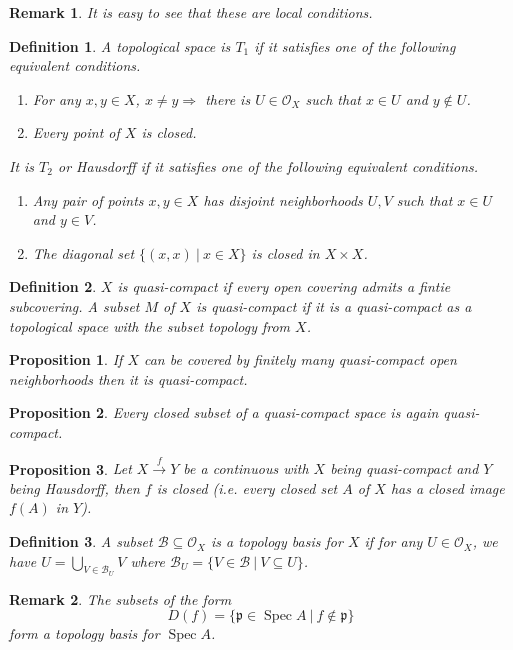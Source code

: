 \documentclass[8pt]{article}
\numberwithin{equation}{section}
\newtheorem{proposition}{Proposition}[subsection]
\newtheorem{definition}{Definition}[subsection]
\newtheorem{remark}{Remark}[subsection]
\DeclareMathOperator{\Spec}{Spec}
\newcommand{\Ouv}{\mathscr{O}}
\newcommand{\sep}[0]{\:|\:}
\begin{document}
\begin{remark}
    It is easy to see that these are local conditions.
\end{remark}
\begin{definition}
    A topological space is $T_1$ if it satisfies one of the following equivalent conditions.
    \begin{enumerate}[1.]
        \item For any $x,y\in X$, $x\not=y\Rightarrow $ there is $U\in\Ouv_X$ such that $x\in U$ and $y\not\in U$.
        \item Every point of $X$ is closed.
    \end{enumerate}
    It is $T_2$ or Hausdorff if it satisfies one of the following equivalent conditions.
    \begin{enumerate}[1.]
        \item Any pair of points $x,y\in X$ has disjoint neighborhoods $U,V$ such that $x\in U$ and $y\in V$.
        \item The diagonal set $\{(x,x)\sep x\in X\}$ is closed in $X\times X$.
    \end{enumerate}
\end{definition}
\begin{definition}
    $X$ is quasi-compact if every open covering admits a fintie subcovering. A subset $M$ of $X$ is quasi-compact if it is a quasi-compact as a topological space with the subset topology from $X$.
\end{definition}
\begin{proposition}
    If $X$ can be covered by finitely many quasi-compact open neighborhoods then it is quasi-compact.
\end{proposition}
\begin{proposition}
    Every closed subset of a quasi-compact space is again quasi-compact.
\end{proposition}
\begin{proposition}
    \label{fact_3}
    Let $X\stackrel{f}{\to}Y$ be a continuous with $X$ being quasi-compact and $Y$ being Hausdorff, then $f$ is closed (i.e. every closed set $A$ of $X$ has a closed image $f(A)$ in $Y$).
\end{proposition}
\begin{definition}
    A subset $\mathcal{B}\subseteq\Ouv_X$ is a topology basis for $X$ if for any $U\in\Ouv_X$, we have $U=\bigcup_{V\in\mathcal{B}_U}V$ where $\mathcal{B}_U=\{V\in\mathcal{B}\sep V\subseteq U\}$.
\end{definition}
\begin{remark}
    The subsets of the form 
    \begin{equation*}
        D(f) = \{\mathfrak{p}\in\Spec A\sep f\not\in \mathfrak{p}\}
    \end{equation*}
    form a topology basis for $\Spec A$.
\end{remark}
\end{document}
